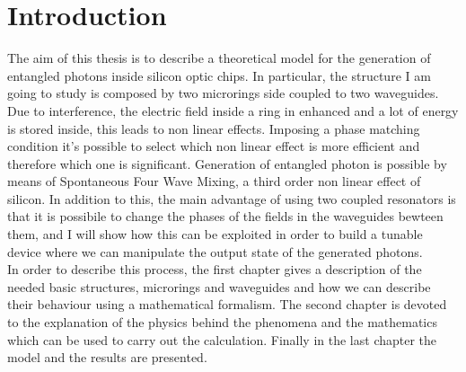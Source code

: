 \chapter{Introduction}
The aim of this thesis is to describe a theoretical model for the generation of entangled photons inside silicon optic chips. In particular, the structure I am going to study is composed by two microrings side coupled to two waveguides. Due to interference, the electric field inside a ring in enhanced and a lot of energy is stored inside, this leads to non linear effects. Imposing a phase matching condition it's possible to select which non linear effect is more efficient and therefore which one is significant. Generation of entangled photon is possible by means of Spontaneous Four Wave Mixing, a third order non linear effect of silicon.
In addition to this, the main advantage of using two coupled resonators is that it is possibile to change the phases of the fields in the waveguides bewteen them, and I will show how this can be exploited in order to build a tunable device where we can manipulate the output state of the generated photons.
\\
In order to describe this process, the first chapter gives a description of the needed basic structures, microrings and waveguides and how we can describe their behaviour using a mathematical formalism. The second chapter is devoted to the explanation of the physics behind the phenomena and the mathematics which can be used to carry out the calculation. Finally in the last chapter the model and the results are presented.

